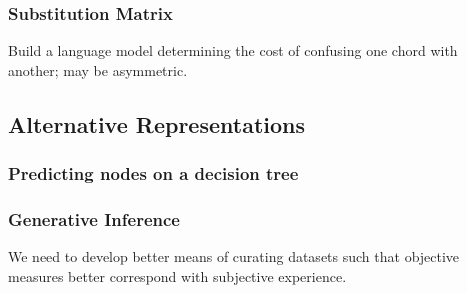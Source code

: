 \subsubsection{Substitution Matrix}
Build a language model determining the cost of confusing one chord with another; may be asymmetric.


\subsection{Alternative Representations}

\subsubsection{Predicting nodes on a decision tree}

\subsubsection{Generative Inference}




We need to develop better means of curating datasets such that objective measures better correspond with subjective experience.
